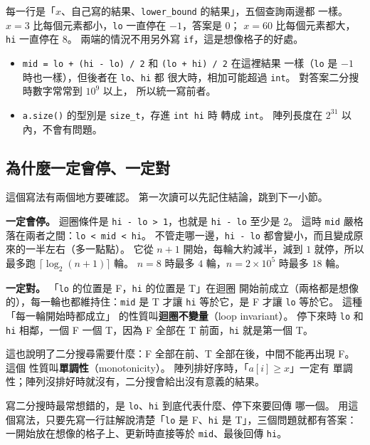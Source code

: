 每一行是「$x$、自己寫的結果、\texttt{lower\_bound} 的結果」，五個查詢兩邊都
一樣。 $x = 3$ 比每個元素都小，\texttt{lo} 一直停在 $-1$，答案是 $0$；
$x = 60$ 比每個元素都大，\texttt{hi} 一直停在 $8$。 兩端的情況不用另外寫
\texttt{if}，這是想像格子的好處。

\begin{itemize}
\item \texttt{mid = lo + (hi - lo) / 2} 和 \texttt{(lo + hi) / 2} 在這裡結果
一樣（\texttt{lo} 是 $-1$ 時也一樣），但後者在 \texttt{lo}、\texttt{hi} 都
很大時，相加可能超過 \texttt{int}。 對答案二分搜時數字常常到 $10^9$ 以上，
所以統一寫前者。
\item \texttt{a.size()} 的型別是 \texttt{size\_t}，存進 \texttt{int hi} 時
轉成 \texttt{int}。 陣列長度在 $2^{31}$ 以內，不會有問題。
\end{itemize}

\subsection{為什麼一定會停、一定對}
\label{sec:bs-why}

這個寫法有兩個地方要確認。 第一次讀可以先記住結論，跳到下一小節。

\textbf{一定會停。} 迴圈條件是 \texttt{hi - lo > 1}，也就是 \texttt{hi - lo}
至少是 $2$。 這時 \texttt{mid} 嚴格落在兩者之間：\texttt{lo < mid < hi}。
不管走哪一邊，\texttt{hi - lo} 都會變小，而且變成原來的一半左右（多一點點）。
它從 $n + 1$ 開始，每輪大約減半，減到 $1$ 就停，所以最多跑
$\lceil \log_2 (n + 1) \rceil$ 輪。 $n = 8$ 時最多 $4$ 輪，$n = 2 \times 10^5$
時最多 $18$ 輪。

\textbf{一定對。} 「\texttt{lo} 的位置是 F，\texttt{hi} 的位置是 T」在迴圈
開始前成立（兩格都是想像的），每一輪也都維持住：\texttt{mid} 是 T 才讓
\texttt{hi} 等於它，是 F 才讓 \texttt{lo} 等於它。 這種「每一輪開始時都成立」
的性質叫\textbf{迴圈不變量}（loop invariant）。 停下來時 \texttt{lo} 和
\texttt{hi} 相鄰，一個 F 一個 T，因為 F 全部在 T 前面，\texttt{hi} 就是第一個
T。

這也說明了二分搜尋需要什麼：F 全部在前、T 全部在後，中間不能再出現 F。 這個
性質叫\textbf{單調性}（monotonicity）。 陣列排好序時，「$a[i] \ge x$」一定有
單調性；陣列沒排好時就沒有，二分搜會給出沒有意義的結果。

寫二分搜時最常想錯的，是 \texttt{lo}、\texttt{hi} 到底代表什麼、停下來要回傳
哪一個。 用這個寫法，只要先寫一行註解說清楚「\texttt{lo} 是 F、\texttt{hi} 是
T」，三個問題就都有答案：一開始放在想像的格子上、更新時直接等於
\texttt{mid}、最後回傳 \texttt{hi}。


